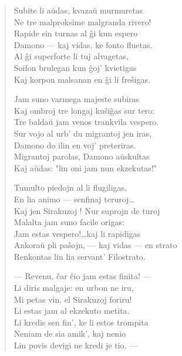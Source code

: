 \begin{verse}
                  Subite li a\u udas, kvaza\u u murmuretas\\
                  Ne tre malproksime malgranda rivero!\\
                  Rapide sin turnas al \^gi kun espero\\
                  Damono --- kaj vidas, ke fonto fluetas.\\
                  Al \^gi superforte li tuj alvagetas,\\
                  Soifon brulegan kun \^goj' kvietigas\\
                  Kaj korpon malsanan en \^gi li fre\^sigas.

                  Jam suno varmega majeste subiras\\
                  Kaj ombroj tre longaj ku\^si\^gas sur tero:\\
                  Tre balda\u u jam venos trankvila vespero.\\
                  Sur vojo al urb' du migrantoj jen iras,\\
                  Damono do ilin en voj' preteriras.\\
                  Migrantoj parolas, Damono a\u uskultas\\
                  Kaj a\u udas: "lin oni jam nun ekzekutas!"

                  Tumulto piedojn al li flugiligas,\\
                  En lia animo --- senfinaj teruroj\dots\\
                  Kaj jen Sirakuzoj ! Nur suprojn de turoj\\
                  Malalta jam suno facile origas:\\
                  Jam estas vespero!\dots kaj li rapidigas\\
                  Ankora\u u pli pa\^sojn, --- kaj vidas --- en strato\\
                  Renkontas lin lia servant' Filostrato.

                  --- Revenu, \^car \^cio jam estas finita! ---\\
                  Li diris malgaje: en urbon ne iru,\\
                  Mi petas vin, el Sirakuzoj foriru!\\
                  Li estas jam al ekzekuto metita.\\
                  Li kredis sen fin', ke li estos trompita\\
                  Neniam de sia amik', kaj nenio\\
                  Lin povis devigi ne kredi je tio. ---


\end{verse}

